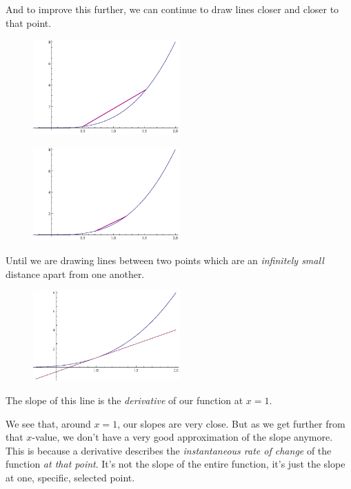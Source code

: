 And to improve this further, we can continue to draw lines closer and closer to that point.
\begin{figure}[H]
  \begin{center}
    \includegraphics[width=0.5\textwidth]{continuous/derivatives/x3_3.eps}
  \end{center}
\end{figure}
\begin{figure}[H]
  \begin{center}
    \includegraphics[width=0.5\textwidth]{continuous/derivatives/x3_4.eps}
  \end{center}
\end{figure}
Until we are drawing lines between two points which are an \emph{infinitely small} distance apart from one another.
\begin{figure}[H]
  \begin{center}
    \includegraphics[width=0.5\textwidth]{continuous/derivatives/x3vline.eps}
  \end{center}
\end{figure}
The slope of this line is the \emph{derivative\/} of our function at $x=1$.

We see that, around $x=1$, our slopes are very close.
But as we get further from that $x$-value, we don't have a very good approximation of the slope anymore.
This is because a derivative describes the {\em instantaneous rate of change\/} of the function \emph{at that point}.
It's not the slope of the entire function, it's just the slope at one, specific, selected point.

